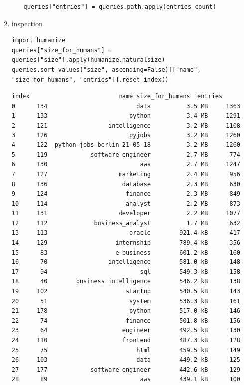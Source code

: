 \documentclass[11pt]{article}
\begin{document}
\begin{enumerate}
\begin{enumerate}
\begin{verbatim}
queries["entries"] = queries.path.apply(entries_count)
\end{verbatim}
\end{enumerate}

\item inspection
\label{sec:orgf6466dc}
\begin{verbatim}
import humanize
queries["size_for_humans"] = queries["size"].apply(humanize.naturalsize)
queries.sort_values("size", ascending=False)[["name", "size_for_humans", "entries"]].reset_index()
\end{verbatim}

\begin{verbatim}
index                         name size_for_humans  entries
0      134                         data          3.5 MB     1363
1      133                       python          3.4 MB     1291
2      121                 intelligence          3.2 MB     1108
3      126                       pyjobs          3.2 MB     1260
4      122  python-jobs-berlin-21-05-18          3.2 MB     1260
5      119            software engineer          2.7 MB      774
6      130                          aws          2.7 MB     1247
7      127                    marketing          2.4 MB      956
8      136                     database          2.3 MB      630
9      124                      finance          2.3 MB      849
10     114                      analyst          2.2 MB      873
11     131                    developer          2.2 MB     1077
12     112             business_analyst          1.7 MB      632
13     113                       oracle        921.4 kB      417
14     129                   internship        789.4 kB      356
15      83                   e business        601.2 kB      160
16      70                 intelligence        581.0 kB      148
17      94                          sql        549.3 kB      158
18      40        business intelligence        546.2 kB      138
19     102                      startup        540.5 kB      143
20      51                       system        536.3 kB      161
21     178                       python        517.0 kB      146
22      74                      finance        501.8 kB      156
23      64                     engineer        492.5 kB      130
24     110                     frontend        487.3 kB      128
25      75                         html        459.5 kB      149
26     103                         data        449.2 kB      125
27     177            software engineer        442.6 kB      129
28      89                          aws        439.1 kB      100

\end{verbatim}
\end{enumerate}
\end{document}
